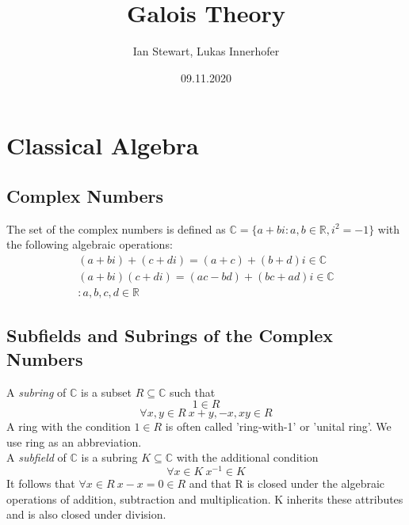 \documentclass{book}
\title{Galois Theory}
\author{Ian Stewart, Lukas Innerhofer}
\date{09.11.2020}
\begin{document}
    \maketitle
    \tableofcontents

    \chapter{Classical Algebra}
    \section{Complex Numbers}
    The set of the complex numbers is defined as 
    \(\mathbb{C} = \{a + bi : a,b \in \mathbb{R},i^2 = -1\}\)
    with the following algebraic operations:
    \begin{equation} \label{equation: complex operations}
    \begin{split}
        (a + bi) + (c + di) = (a + c) + (b + d)i \in \mathbb{C}\\
        (a + bi)(c + di) = (ac - bd) + (bc + ad)i \in \mathbb{C}\\
        :a,b,c,d \in \mathbb{R}
    \end{split}
    \end{equation}

    \section{Subfields and Subrings of the Complex Numbers}
    \begin{definition}
        A \textit{subring} of \(\mathbb{C}\) is a subset \(R \subseteq \mathbb{C}\) such that
        \[1 \in R\]
        \[\forall x,y \in R \ x + y,-x,xy \in R\]
        A ring with the condition \(1 \in R\) is often called 'ring-with-1' or 'unital ring'.
        We use ring as an abbreviation.\\
        A \textit{subfield} of \(\mathbb{C}\) is a subring \(K \subseteq \mathbb{C}\)
        with the additional condition
        \[\forall x \in K \ x^{-1} \in K\]
        It follows that \(\forall x \in R \ x - x = 0 \in R\)
        and that R is closed under the algebraic operations of addition, subtraction and multiplication.
        K inherits these attributes and is also closed under division.
    \end{definition}
\end{document}
